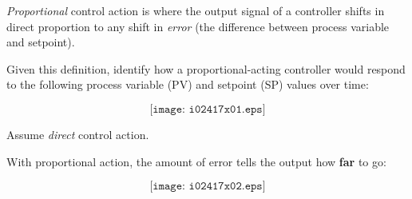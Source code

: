 

{\it Proportional} control action is where the output signal of a controller shifts in direct proportion to any shift in {\it error} (the difference between process variable and setpoint).

Given this definition, identify how a proportional-acting controller would respond to the following process variable (PV) and setpoint (SP) values over time:

$$\texttt{[image: i02417x01.eps]}$$

Assume {\it direct} control action.







With proportional action, the amount of error tells the output how {\bf far} to go:

$$\texttt{[image: i02417x02.eps]}$$











